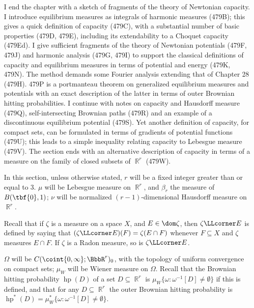 
\def\hp{\mathop{\text{hp}}\nolimits}
\def\rdtf{rapidly decreasing test function}
\def\varinnerprod#1#2{#1\dotproduct#2}
\def\zz{}
\def\trs{^{\top}}


\def\chaptername{Geometric measure theory}
\def\sectionname{Newtonian capacity}

I end the chapter with a sketch of fragments of the theory of Newtonian
capacity.   I introduce equilibrium measures as integrals
of harmonic measures (479B);  this gives a quick definition of capacity
(479C), with a substantial number of basic properties (479D, 479E),
including its extendability to a Choquet capacity (479Ed).
I give sufficient fragments of the theory of Newtonian potentials (479F,
479J) and harmonic analysis (479G, 479I) to support the classical
definitions of capacity and equilibrium measures in terms of potential and
energy (479K, 479N).   The method demands some Fourier analysis extending
that of Chapter 28 (479H).
479P is a portmanteau theorem on generalized equilibrium measures and
potentials with an exact description of the latter in terms of outer
Brownian hitting probabilities.
I continue with notes on
capacity and Hausdorff measure (479Q), self-intersecting Brownian
paths (479R) and an example of a discontinuous equilibrium potential
(479S).   Yet another definition of capacity, for
compact sets, can be formulated in terms of gradients of potential
functions (479U);  this leads to a simple inequality relating
capacity to Lebesgue measure (479V).   The section ends with an alternative
description of capacity in terms of a measure on the family of closed
subsets of $\BbbR^r$ (479W).

 In this section, unless otherwise stated,
$r$ will be a fixed integer greater than or equal to $3$.
$\mu$ will be Lebesgue measure on $\BbbR^r$,
and $\beta_r$ the measure of $B(\tbf{0},1)$;
$\nu$ will be normalized $(r-1)$-dimensional Hausdorff
measure on $\BbbR^r$.

Recall that if $\zeta$ is a measure on a space $X$, and
$E\in\dom\zeta$, then $\zeta\LLcorner E$ is defined by saying that
$(\zeta\LLcorner E)(F)=\zeta(E\cap F)$ whenever $F\subseteq X$ and
$\zeta$ measures $E\cap F$.
If $\zeta$ is a Radon measure, so is
$\zeta\LLcorner E$.

$\Omega$ will be $C(\coint{0,\infty};\BbbR^r)_0$,
with the topology of
uniform convergence on compact sets;
$\mu_W$ will be Wiener measure on $\Omega$.
Recall that the Brownian hitting probability $\hp(D)$
of a set $D\subseteq\BbbR^r$
is $\mu_W\{\omega:\omega^{-1}[D]\ne\emptyset\}$ if this is
defined, and that for any $D\subseteq\BbbR^r$ the outer
Brownian hitting probability is
$\hp^*(D)=\mu_W^*\{\omega:\omega^{-1}[D]\ne\emptyset\}$.

